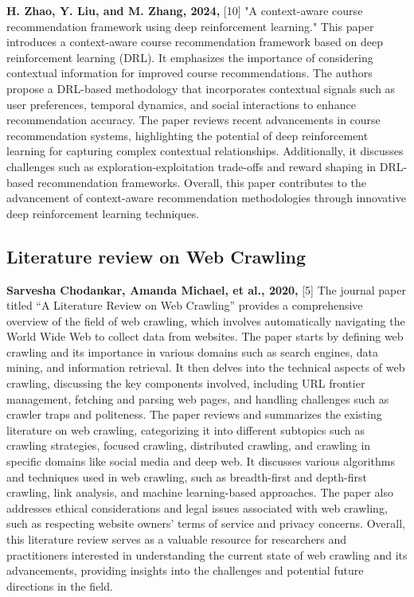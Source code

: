\textbf{H. Zhao, Y. Liu, and M. Zhang, 2024,} [10] "A context-aware course recommendation framework using deep reinforcement learning." This paper introduces a context-aware course recommendation framework based on deep reinforcement learning (DRL). It emphasizes the importance of considering contextual information for improved course recommendations. The authors propose a DRL-based methodology that incorporates contextual signals such as user preferences, temporal dynamics, and social interactions to enhance recommendation accuracy. The paper reviews recent advancements in course recommendation systems, highlighting the potential of deep reinforcement learning for capturing complex contextual relationships. Additionally, it discusses challenges such as exploration-exploitation trade-offs and reward shaping in DRL-based recommendation frameworks. Overall, this paper contributes to the advancement of context-aware recommendation methodologies through innovative deep reinforcement learning techniques.

\subsection{Literature review on Web Crawling}

\textbf{Sarvesha Chodankar, Amanda Michael, et al., 2020,} [5] The journal paper titled “A Literature Review on Web Crawling” provides a comprehensive overview of the field of web crawling, which involves
automatically navigating the World Wide Web to collect data from websites. The paper starts by defining web crawling and its importance in various domains such as search engines, data mining, and information retrieval. It then delves into the technical aspects of web crawling, discussing the key components involved, including URL frontier management, fetching and parsing web pages, and handling challenges such as crawler traps and politeness. The paper reviews and summarizes the existing literature on web crawling, categorizing it into different subtopics such as crawling strategies, focused crawling, distributed crawling, and crawling in specific domains like social media and deep web. It discusses various algorithms and techniques used in web crawling, such as breadth-first and depth-first crawling, link analysis, and machine learning-based approaches. The paper also addresses ethical considerations and legal issues associated with web crawling, such as respecting website owners’ terms of service and privacy concerns. Overall, this literature review serves as a valuable resource for researchers and practitioners interested in understanding the current state of web crawling and its advancements, providing insights into the challenges and potential future directions in the field.


